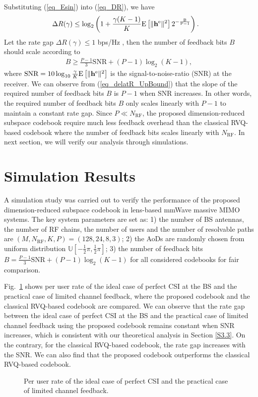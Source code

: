 \documentclass[10pt,twocolumn,twoside]{IEEEtran}
\begin{document}
Substituting (\ref{eq_Esin}) into (\ref{eq_DR}), we have
\begin{align}\label{delatR4}
\Delta R(\gamma)&\leq \log_2\left( 1+\frac{\gamma(K-1)}{K}\rm{E}\left[ \|\mathbf{h}^e\|^2\right] 2^{-\frac{B}{P-1}}\right) .
\end{align}
Let the rate gap $\Delta R(\gamma)\leq 1$ bps/Hz \cite{TIT_NJindal_MIMOBroadcast}, then the number of feedback bits $B$ should scale according to
\begin{align}\label{eq_delatR_UpBound}
B \geq \frac{P-1}{3}\text{SNR}+(P-1)\log_2(K-1),
\end{align}
where $\text{SNR}=10\log_{10}\frac{\gamma}{K}\rm{E}\left[ \|\mathbf{h}^e\|^2\right] $ is the signal-to-noise-ratio (SNR) at the receiver.
We can observe from (\ref{eq_delatR_UpBound}) that the slope of the required number of feedback bits $B$ is $P-1$ when $\text{SNR}$ increases.
In other words, the required number of feedback bits $B$ only scales linearly with $P-1$ to maintain a constant rate gap.
Since $P\ll N_\text{RF}$,
the proposed dimension-reduced subspace codebook require much less feedback overhead than the classical RVQ-based codebook where the number of feedback bits scales linearly with $N_\text{RF}$. In next section, we will verify our analysis through simulations.

\section{Simulation Results}\label{S4}
A simulation study was carried out to verify the performance of the proposed dimension-reduced subspace codebook in lens-based mmWave massive MIMO systems.
The key system parameters are set as:
 1) the number of BS antennas, the number of RF chains, the number of users and the number of resolvable paths are $(M,N_\text{RF}, K,P)=(128,24,8,3)$;
 2) the AoDs are randomly chosen from uniform distribution $\mathbb{U}[-\frac{1}{2}\pi, \frac{1}{2}\pi]$;
 3) the number of feedback bits $B=\frac{P-1}{3}\text{SNR}+ (P-1)\log_2(K-1)$ for all considered codebooks for fair comparison.

Fig.~\ref{Fig1} shows per user rate of the ideal case of perfect CSI at the BS and the practical case of limited channel feedback,
where the proposed codebook and the classical RVQ-based codebook are compared.
We can observe that the rate gap between the ideal case of perfect CSI at the BS and the practical case of limited channel feedback using the proposed codebook remains constant when SNR increases,
which is consistent with our theoretical analysis in Section \ref{S3.3}.
On the contrary, for the classical RVQ-based codebook,
the rate gap increases with the SNR.
We can also find that the proposed codebook outperforms the classical RVQ-based codebook.
\begin{figure}
\vspace{-2mm}
\vspace{-3mm}
\caption{Per user rate of the ideal case of perfect CSI and the practical case of limited channel feedback.}
\label{Fig1}
\end{figure}
\end{document}
